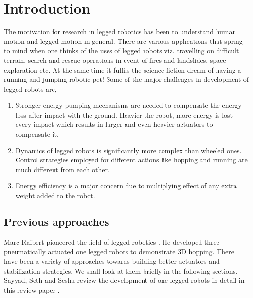  \setcounter{page}{1}
\chapter{Introduction}
\label{chap:intro}
The motivation for research in legged robotics has been to understand human motion and legged motion in general. There are various
applications that spring to mind when one thinks of the uses of legged robots viz. travelling on difficult terrain, search and rescue
operations in event of fires and landslides, space exploration etc. At the same time it fulfils the science fiction dream of having
a running and jumping robotic pet! Some of the major challenges in development of legged robots are, \cite{review}    
\begin{enumerate}
\item
Stronger energy pumping mechanisms are needed to compensate the energy loss after impact with the ground. Heavier the robot, more
energy is lost every impact which results in larger and even heavier actuators to compensate it.
\item
Dynamics of legged robots is significantly more complex than wheeled ones. Control strategies employed for different actions like
hopping and running are much different from each other.
\item
Energy efficiency is a major concern due to multiplying effect of any extra weight added to the robot.
\end{enumerate}

\section{Previous approaches}
Marc Raibert pioneered the field of legged robotics \cite{leglab, raibert_book}. He developed three pneumatically actuated one legged
robots to demonstrate 3D hopping. There have been a variety of approaches towards building better actuators and stabilization 
strategies. We shall look at them briefly in the following sections. Sayyad, Seth and Seshu review the development of one legged 
robots in detail in this review paper \cite{review}.

